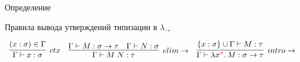 \begin{frame}{Определение \secname}
        \pause
        \begin{block}{Правила вывода утверждений типизации в $\lambda_{\rightarrow}$}
            \vspace{-1em}
            \begin{center}
                \[
                    \begin{array}{l c r}
                        \infer[ctx]{\Gamma \vdash x: \sigma}{(x: \sigma) \in \Gamma}
                        &
                        \infer[elim\to]{\Gamma \vdash M\;N : \tau}{\Gamma \vdash M : \sigma \to \tau & \Gamma \vdash N : \sigma}
                        &
                        \infer[intro\to]{\Gamma \vdash \lambda x^{\color{red} \sigma}\ldotp M : \sigma \to \tau}{\{x : \sigma\} \cup \Gamma \vdash M : \tau}
                    \end{array}
                \]
            \end{center}
        \end{block}
    \end{frame}


